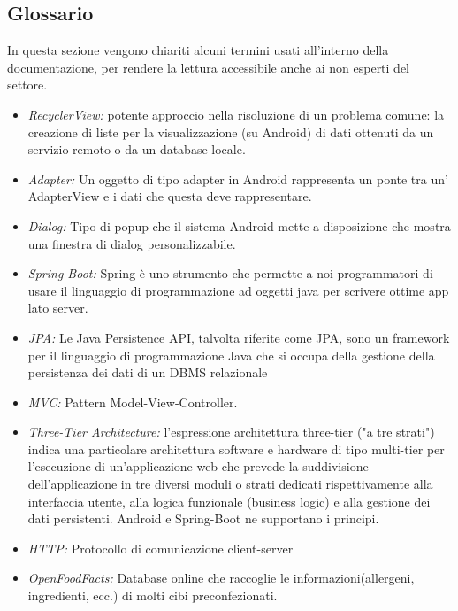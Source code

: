 \subsection{Glossario}
    \begin{flushleft}
        In questa sezione vengono chiariti alcuni termini usati all'interno della documentazione, per rendere la lettura accessibile
        anche ai non esperti del settore.
    \end{flushleft}

    \begin{itemize}
        \item \emph{RecyclerView:} potente approccio nella risoluzione di un problema comune: la creazione di liste per la visualizzazione (su Android) di dati ottenuti da un servizio remoto o da un database locale.
        \item \emph{Adapter:} Un oggetto di tipo adapter in Android rappresenta un ponte tra un' AdapterView e i dati che questa deve rappresentare.
        \item \emph{Dialog:} Tipo di popup che il sistema Android mette a disposizione che mostra una finestra di dialog personalizzabile.
        \item \emph{Spring Boot:} Spring è uno strumento che permette a noi programmatori di usare il linguaggio di programmazione ad oggetti java per scrivere ottime app lato server.
        \item \emph{JPA:} Le Java Persistence API, talvolta riferite come JPA, sono un framework per il linguaggio di programmazione Java che si occupa della gestione della persistenza dei dati di un DBMS relazionale
        \item \emph{MVC:} Pattern Model-View-Controller.
        \item \emph{Three-Tier Architecture:} l'espressione architettura three-tier ("a tre strati") indica una particolare architettura software e hardware di tipo multi-tier per l'esecuzione di un'applicazione web che prevede la suddivisione dell'applicazione in tre diversi 
        moduli o strati dedicati rispettivamente alla interfaccia utente, alla logica funzionale (business logic) e alla gestione dei dati persistenti. Android e Spring-Boot ne supportano i principi.
        \item \emph{HTTP:} Protocollo di comunicazione client-server
        \item \emph{OpenFoodFacts:} Database online che raccoglie le informazioni(allergeni, ingredienti, ecc.) di molti cibi preconfezionati.
    \end{itemize}